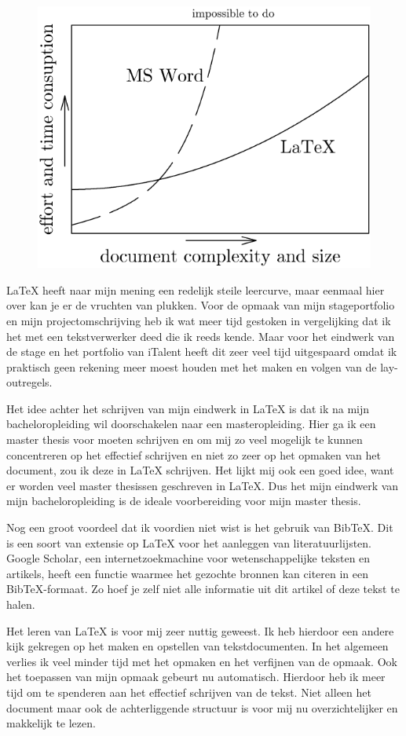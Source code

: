 \begin{figure}[!h]
  \centering
  \includegraphics[width=0.48\linewidth]{images/latex/ms_word_vs_latex.png}
\end{figure}

\LaTeX{} heeft naar mijn mening een redelijk steile leercurve, maar eenmaal hier over kan je  er de vruchten van plukken. Voor de opmaak van mijn stageportfolio en mijn projectomschrijving heb ik wat meer tijd gestoken in vergelijking dat ik het met een tekstverwerker deed die ik reeds kende. Maar voor het eindwerk van de stage en het portfolio van iTalent heeft dit zeer veel tijd uitgespaard omdat ik praktisch geen rekening meer moest houden met het maken en volgen van de lay\hyp{}outregels.

Het idee achter het schrijven van mijn eindwerk in \LaTeX{} is dat ik na mijn bacheloropleiding wil doorschakelen naar een masteropleiding. Hier ga ik een master thesis voor moeten schrijven en om mij zo veel mogelijk te kunnen concentreren op het effectief schrijven en niet zo zeer op het opmaken van het document, zou ik deze in \LaTeX{} schrijven. Het lijkt mij ook een goed idee, want er worden veel master thesissen geschreven in \LaTeX{}. Dus het mijn eindwerk van mijn bacheloropleiding is de ideale voorbereiding voor mijn master thesis.

Nog een groot voordeel dat ik voordien niet wist is het gebruik van Bib\TeX{}. Dit is een soort van extensie op \LaTeX{} voor het aanleggen van literatuurlijsten. Google Scholar, een internetzoekmachine voor wetenschappelijke teksten en artikels, heeft een functie waarmee het gezochte bronnen kan citeren in een Bib\TeX{}\hyp{}formaat. Zo hoef je zelf niet alle informatie uit dit artikel of deze tekst te halen.

Het leren van \LaTeX{} is voor mij zeer nuttig geweest. Ik heb hierdoor een andere kijk gekregen op het maken en opstellen van tekstdocumenten. In het algemeen verlies ik veel minder tijd met het opmaken en het verfijnen van de opmaak. Ook het toepassen van mijn opmaak gebeurt nu automatisch. Hierdoor heb ik meer tijd om te spenderen aan het effectief schrijven van de tekst. Niet alleen het document maar ook de achterliggende structuur is voor mij nu overzichtelijker en makkelijk te lezen.

